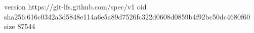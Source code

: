 version https://git-lfs.github.com/spec/v1
oid sha256:616c0342a3d5848e114a6e5a89d7526fc322d0608d0859b4f92bc50dc4680f60
size 87544
